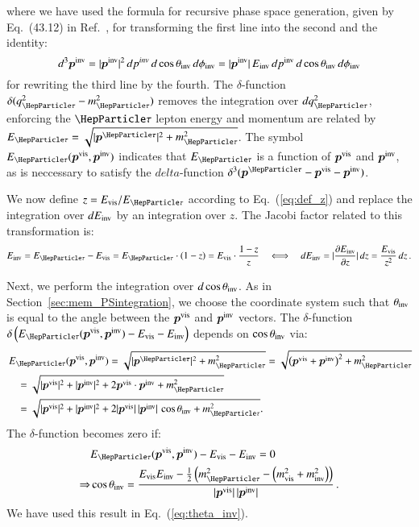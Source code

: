 where we have used the formula for recursive phase space generation,
given by Eq.~(43.12) in Ref.~\cite{PDG}, for transforming the first line into the second
and the identity:
\begin{equation} 
d^{3}\bm{p^{\textrm{inv}}} = \vert\bm{p^{\textrm{inv}}}\vert^{2} \,
dp^{inv} \, d\cos\theta_{\textrm{inv}} \, d\phi_{\textrm{inv}} =
\vert\bm{p^{\textrm{inv}}}\vert \, E_{\textrm{inv}} \, dp^{\textrm{inv}} \, d\cos\theta_{\textrm{inv}}
\, d\phi_{\textrm{inv}}
\end{equation} 
for rewriting the third line by the fourth.
The $\delta$-function $\delta ( q_{\Pgt}^{2} - m_{\Pgt}^{2} )$ removes
the integration over $dq^{2}_{\Pgt}$, enforcing the $\Pgt$ lepton
energy and momentum are related by $E_{\Pgt} =
\sqrt{\vert\bm{p^{\Pgt}}\vert^{2} + m_{\Pgt}^{2}}$.
The symbol $E_{\Pgt}(\bm{p^{\vis}}, \bm{p^{\inv}})$
indicates that $E_{\Pgt}$ is a function of $\bm{p^{\textrm{vis}}}$
and $\bm{p^{\textrm{inv}}}$, as is neccessary to satisfy the $
delta$-function $\delta^{3} ( \bm{p^{\Pgt}} - \bm{p^{\vis}} - \bm{p^{\inv}} )$.

We now define $z = E_{\vis}/E_{\Pgt}$ according to Eq.~(\ref{eq:def_z}) and replace the integration over $dE_{\textrm{inv}}$ by an integration over $z$.
The Jacobi factor related to this transformation is:
\begin{equation}
E_{\inv} = E_{\Pgt} - E_{\vis} = E_{\Pgt} \cdot \left( 1 - z \right) = E_{\vis} \cdot \frac{1 - z}{z} 
  \quad \Longleftrightarrow \quad dE_{\inv} = \lvert \frac{\partial E_{\inv}}{\partial z} \rvert \, dz = \frac{E_{\vis}}{z^{2}} \, dz \, .
\label{eq:hadTauDecaysJacobi}
\end{equation}

Next, we perform the integration over $d\cos\theta_{\textrm{inv}}$.
As in Section~\ref{sec:mem_PSintegration}, we choose the coordinate system such that
$\theta_{\textrm{inv}}$ is equal to the angle between the $\bm{p^{\textrm{vis}}}$ and $\bm{p^{\textrm{inv}}}$ vectors.
The $\delta$-function $\delta \left( E_{\Pgt}(\bm{p^{\vis}}, \bm{p^{\inv}}) - E_{\vis} - E_{\inv} \right)$ depends on $\cos\theta_{\textrm{inv}}$ via:
\begin{align}
& \, E_{\Pgt}(\bm{p^{\vis}}, \bm{p^{\inv}}) 
= \sqrt{\vert\bm{p^{\Pgt}}\vert^{2} + m^{2}_{\Pgt}} = \sqrt{\left( \bm{p^{\vis}} + \bm{p^{\inv}} \right)^2 + m^{2}_{\Pgt}} \nonumber \\
& \quad = \sqrt{\vert\bm{p^{\vis}}\vert^{2} + \vert\bm{p^{\inv}}\vert^{2} + 2 \bm{p^{\vis}}
  \cdot \bm{p^{\inv}} + m^{2}_{\Pgt}} \nonumber \\
& \quad = \sqrt{\vert\bm{p^{\vis}}\vert^{2} + \vert\bm{p^{\inv}}\vert^{2} + 2 \vert\bm{p^{\vis}}\vert \, \vert\bm{p^{\inv}}\vert \, \cos\theta_{\inv} + m^{2}_{\Pgt}}.
\end{align}
The $\delta$-function becomes zero if:
\begin{align}
& E_{\Pgt}(\bm{p^{\vis}}, \bm{p^{\inv}}) - E_{\vis} - E_{\inv} = 0 \nonumber \\
\Rightarrow & \cos\theta_{\inv} 
  = \frac{E_{\vis} E_{\inv} - \frac{1}{2} \left(m^{2}_{\Pgt} - \left(
        m^{2}_{\vis} + m^{2}_{\inv} \right)
    \right)}{\vert\bm{p^{\vis}}\vert \, \vert\bm{p^{\inv}}\vert} \, .
\label{eq:hadTauDecaysCosTheta}
\end{align}
We have used this result in Eq.~(\ref{eq:theta_inv}).

